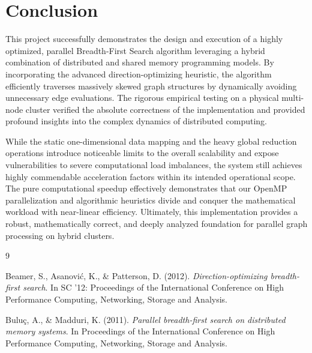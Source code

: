 \section{Conclusion}

This project successfully demonstrates the design and execution of a highly optimized, parallel Breadth-First Search algorithm leveraging a hybrid combination of distributed and shared memory programming models. By incorporating the advanced direction-optimizing heuristic, the algorithm efficiently traverses massively skewed graph structures by dynamically avoiding unnecessary edge evaluations. The rigorous empirical testing on a physical multi-node cluster verified the absolute correctness of the implementation and provided profound insights into the complex dynamics of distributed computing.

While the static one-dimensional data mapping and the heavy global reduction operations introduce noticeable limits to the overall scalability and expose vulnerabilities to severe computational load imbalances, the system still achieves highly commendable acceleration factors within its intended operational scope. The pure computational speedup effectively demonstrates that our OpenMP parallelization and algorithmic heuristics divide and conquer the mathematical workload with near-linear efficiency. Ultimately, this implementation provides a robust, mathematically correct, and deeply analyzed foundation for parallel graph processing on hybrid clusters.

\vspace{1.2cm}
\begin{thebibliography}{9}

Beamer, S., Asanović, K., \& Patterson, D. (2012). 
\textit{Direction-optimizing breadth-first search}. 
In SC '12: Proceedings of the International Conference on High Performance Computing, Networking, Storage and Analysis.

Buluç, A., \& Madduri, K. (2011). 
\textit{Parallel breadth-first search on distributed memory systems}. 
In Proceedings of the International Conference on High Performance Computing, Networking, Storage and Analysis.

\end{thebibliography}

